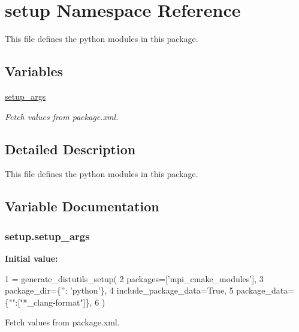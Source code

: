 \hypertarget{namespacesetup}{}\section{setup Namespace Reference}
\label{namespacesetup}


This file defines the python modules in this package.  


\subsection*{Variables}
\begin{DoxyCompactItemize}
\item 
\hyperlink{namespacesetup_a504ffa482edfe0eff08f64b2f5dff0e9}{setup\+\_\+args}
\begin{DoxyCompactList}\small\item\em Fetch values from package.\+xml. \end{DoxyCompactList}\end{DoxyCompactItemize}


\subsection{Detailed Description}
This file defines the python modules in this package. 

\subsection{Variable Documentation}
\subsubsection[{\texorpdfstring{setup\+\_\+args}{setup_args}}]{\setlength{\rightskip}{0pt plus 5cm}setup.\+setup\+\_\+args}\hypertarget{namespacesetup_a504ffa482edfe0eff08f64b2f5dff0e9}{}\label{namespacesetup_a504ffa482edfe0eff08f64b2f5dff0e9}
{\bfseries Initial value\+:}
\begin{DoxyCode}
1 = generate\_distutils\_setup(
2     packages=[\textcolor{stringliteral}{'mpi\_cmake\_modules'}],
3     package\_dir=\{\textcolor{stringliteral}{''}: \textcolor{stringliteral}{'python'}\},
4     include\_package\_data=\textcolor{keyword}{True},
5     package\_data=\{\textcolor{stringliteral}{""}:[\textcolor{stringliteral}{"*\_clang-format"}]\},
6 )
\end{DoxyCode}


Fetch values from package.\+xml. 

